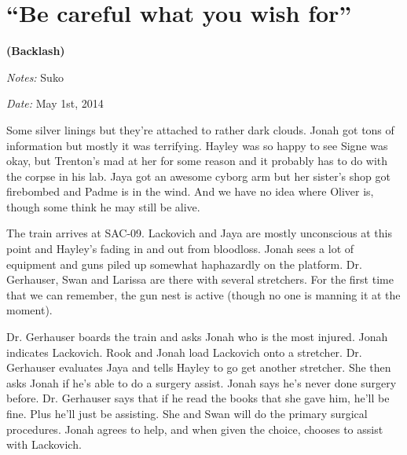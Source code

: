 \setcounter{chapter}{ 23 }
\chapter{\textbf{``Be careful what you wish for''} }




\begin{center}
 {\LARGE \textbf{(Backlash)} } 
\end{center}




\textit{Notes:} Suko

\textit{Date:} May 1st, 2014



Some silver linings but they're attached to rather dark clouds.  Jonah got tons of information but mostly it was terrifying. Hayley was so happy to see Signe was okay, but Trenton's mad at her for some reason and it probably has to do with the corpse in his lab.  Jaya got an awesome cyborg arm but her sister's shop got firebombed and Padme is in the wind.  And we have no idea where Oliver is, though some think he may still be alive.



\noindent\hrulefill








The train arrives at SAC-09.  Lackovich and Jaya are mostly unconscious at this point and Hayley's fading in and out from bloodloss.  Jonah sees a lot of equipment and guns piled up somewhat haphazardly on the platform. Dr. Gerhauser, Swan and Larissa are there with several stretchers.  For the first time that we can remember, the gun nest is active (though no one is manning it at the moment).



Dr. Gerhauser boards the train and asks Jonah who is the most injured.  Jonah indicates Lackovich.  Rook and Jonah load Lackovich onto a stretcher.  Dr. Gerhauser evaluates Jaya and tells Hayley to go get another stretcher.  She then asks Jonah if he's able to do a surgery assist.  Jonah says he's never done surgery before.  Dr. Gerhauser says that if he read the books that she gave him, he'll be fine.  Plus he'll just be assisting.  She and Swan will do the primary surgical procedures.  Jonah agrees to help, and when given the choice, chooses to assist with Lackovich.

